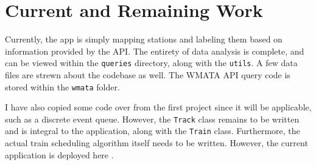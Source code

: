 \documentclass[a4paper,12pt]{article}
\begin{document}
\section{Current and Remaining Work}
Currently, the app is simply mapping stations and labeling them based on information provided by the API. The entirety
of data analysis is complete, and can be
viewed within the \texttt{queries} directory, along with the \texttt{utils}. A few data files are strewn about the
codebase as well. The WMATA API query code is stored within the \texttt{wmata} folder.

I have also copied some code over from the first project since it will be applicable, such as a discrete event queue.
However, the \texttt{Track} class remains to be written and is integral to the application, along with the \texttt{Train}
class. Furthermore, the actual
train scheduling algorithm itself needs to be written. However, the current application is deployed here
\cite{aprilandchip}.



\end{document}
